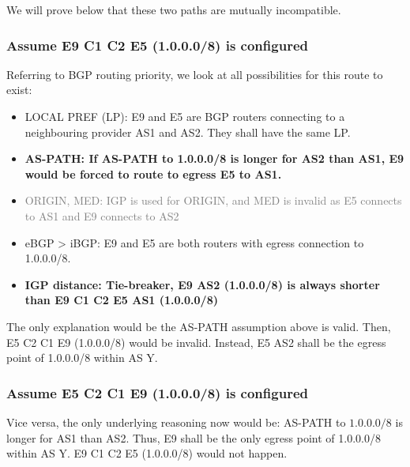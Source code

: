 \documentclass[12pt]{article}
\begin{document}
We will prove below that these two paths are mutually incompatible.

\subsubsection{Assume E9 \textrightarrow{} C1 \textrightarrow{} C2 \textrightarrow{} E5 (1.0.0.0/8) is configured}

Referring to BGP routing priority, we look at all possibilities for this route to exist:
\begin{itemize}
    \item LOCAL PREF (LP): E9 and E5 are BGP routers connecting to a neighbouring provider AS1 and AS2. They shall have the same LP.
    \item \textbf{AS-PATH: If AS-PATH to 1.0.0.0/8 is longer for AS2 than AS1, E9 would be forced to route to egress E5 to AS1.}
    \item \textcolor{grey}{ORIGIN, MED: IGP is used for ORIGIN, and MED is invalid as E5 connects to AS1 and E9 connects to AS2}
    \item eBGP \textgreater{} iBGP: E9 and E5 are both routers with egress connection to 1.0.0.0/8.
    \item \textbf{IGP distance: Tie-breaker, E9 \textrightarrow{} AS2 (1.0.0.0/8) is always shorter than E9 \textrightarrow{} C1 \textrightarrow{} C2 \textrightarrow{} E5 \textrightarrow{} AS1 (1.0.0.0/8)}
\end{itemize}

The only explanation would be the AS-PATH assumption above is valid. Then, E5 \textrightarrow{} C2 \textrightarrow{} C1 \textrightarrow{} E9 (1.0.0.0/8) would be invalid. Instead, E5 \textrightarrow{} AS2 shall be the egress point of 1.0.0.0/8 within AS Y.

\subsubsection{Assume E5 \textrightarrow{} C2 \textrightarrow{} C1 \textrightarrow{} E9 (1.0.0.0/8) is configured}

Vice versa, the only underlying reasoning now would be: AS-PATH to $1.0.0.0/8$ is longer for AS1 than AS2. Thus, E9 shall be the only egress point of 1.0.0.0/8 within AS Y. E9 \textrightarrow{} C1 \textrightarrow{} C2 \textrightarrow{} E5 (1.0.0.0/8) would not happen.

\subsection{}
\end{document}
